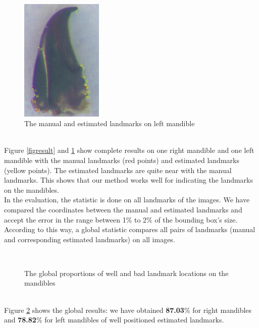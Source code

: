 \documentclass[twoside,twocolumn,10pt]{article}
\begin{document}
\begin{figure}[h]
\centering
\includegraphics[width=0.35\textwidth]{./images/mg_rs}
\caption{The manual and estimated landmarks on left mandible}
\label{figresult2}
\end{figure}~\\

Figure \ref{figresult} and \ref{figresult2} show complete results on one right mandible and one left mandible with the manual landmarks (red points) and estimated landmarks (yellow points). The estimated landmarks are quite near with the manual landmarks. This shows that our method works well for indicating the landmarks on the mandibles.\\

In the evaluation, the statistic is done on all landmarks of the images. We have compared the coordinates between the manual and estimated landmarks and accept the error in the range between 1\% to 2\% of the bounding box's size. According to this way, a global statistic compares all pairs of landmarks (manual and corresponding estimated landmarks) on all images.
\begin{figure}[h]
\centering
{}~~
\caption{The global proportions of well and bad landmark locations on the mandibles}
\label{figctresult}
\end{figure}~\\
Figure \ref{figctresult} shows the global results: we have obtained \textbf{87.03}\% for right mandibles and \textbf{78.82}\% for left mandibles of well positioned estimated landmarks.\\
\end{document}
